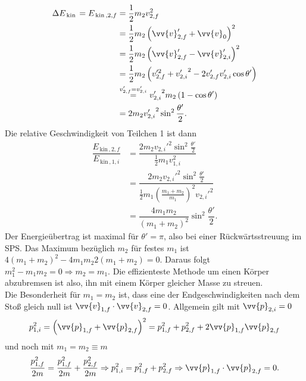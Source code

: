 \documentclass[a4paper,12pt]{article}
\numberwithin{equation}{section}
\begin{document}
\begin{align*}
        \Delta E_{\,\text{kin}\,}=E_{\,\text{kin}\,,2,f}&=\dfrac{1}{2}m_2v_{2,f}^2\\
                                                        &=\dfrac{1}{2}m_2\left(\vv{v}_{2,f}'+\vv{v}_0\right)^2\\
                                                        &=\dfrac{1}{2}m_2\left(\vv{v}_{2,f}'-\vv{v}_{2,i}'\right)^2\\
                                                        &=\dfrac{1}{2}m_2\left(v_{2,f}'^2+{v_{2,i}'}^2-2v_{2,f}'v_{2,i}'\cos \theta '\right)\\
                                                        &\stackrel{v_{2,f}'=v_{2,i}'}{=}{v_{2,i}'}^2m_2\left(1-\cos \theta '\right)\\
                                                        &=2m_2{v_{2,i}'}^2\sin ^2\dfrac{\theta '}{2}
.\end{align*}
Die relative Geschwindigkeit von Teilchen 1 ist dann
\begin{align*}
        \dfrac{E_{\,\text{kin}\,,2,f}}{E_{\,\text{kin}\,,1,i}}&=\dfrac{2m_2{v_{2,i}'}^2\sin ^2\tfrac{\theta '}{2}}{\tfrac{1}{2}m_1v_{1,i}^2}\\
                                                              &=\dfrac{2m_2{v_{2,i}'}^2\sin ^2\tfrac{\theta '}{2}}{\tfrac{1}{2}m_1\left(\tfrac{m_1+m_2}{m_1}\right)^2{v_{2,i}'}^2}\\
                                                              &=\dfrac{4m_1m_2}{\left(m_1+m_2\right)^2}\sin ^2\dfrac{\theta '}{2}
.\end{align*}
Der Energieübertrag ist maximal für $\theta '=\pi $, also bei einer Rückwärtsstreuung im SPS. Das Maximum bezüglich $m_2$ für festes $m_1$ ist $4\left(m_1+m_2\right)^2-4m_1m_2 2\left(m_1+m_2\right)=0$. Daraus folgt $m_1^2-m_1m_2=0\Rightarrow m_2=m_1$. Die effizienteste Methode um einen Körper abzubremsen ist also, ihn mit einem Körper gleicher Masse zu streuen.\\\indent 
Die Besonderheit für $m_1=m_2$ ist, dass eine der Endgeschwindigkeiten nach dem Stoß gleich null ist $\vv{v}_{1,f}\cdot \vv{v}_{2,f}=0$. Allgemein gilt mit $\vv{p}_{2,i}=0$
\[ 
        p_{1,i}^2=\left(\vv{p}_{1,f}+\vv{p}_{2,f}\right)^2=p_{1,f}^2+p_{2,f}^2+2\vv{p}_{1,f}\vv{p}_{2,f}
\] 
und noch mit $m_1=m_2\equiv m$
\[ 
        \dfrac{p_{1,f}^2}{2m}=\dfrac{p_{1,f}^2}{2m}+\dfrac{p_{2,f}^2}{2m}\Rightarrow p_{1,i}^2=p_{1,f}^2+p_{2,f}^2\Rightarrow \vv{p}_{1,f}\cdot \vv{p}_{2,f}=0
.\] 
\end{document}
